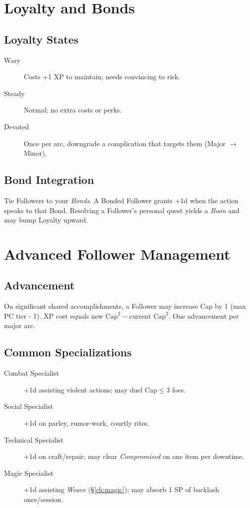 \begin{multicols}{2}
\section{Loyalty and Bonds}

\subsection*{Loyalty States}
\begin{description}
  \item[Wary] Costs +1 XP to maintain; needs convincing to risk.
  \item[Steady] Normal; no extra costs or perks.
  \item[Devoted] Once per arc, downgrade a complication that targets them (Major \(\rightarrow\) Minor). 
\end{description}

\subsection*{Bond Integration}
Tie Followers to your \emph{Bonds}. A Bonded Follower grants +1d when the action speaks to that Bond. Resolving a Follower’s personal quest yields a \emph{Boon} and may bump Loyalty upward.

\section{Advanced Follower Management}

\subsection*{Advancement}
On significant shared accomplishments, a Follower may increase Cap by 1 (max PC tier - 1). XP cost equals \(\text{new Cap}^2 - \text{current Cap}^2\). One advancement per major arc.

\subsection*{Common Specializations}
\begin{description}
  \item[Combat Specialist] +1d assisting violent actions; may duel Cap\(\leq\)3 foes.
  \item[Social Specialist] +1d on parley, rumor-work, courtly rites.
  \item[Technical Specialist] +1d on craft/repair; may clear \emph{Compromised} on one item per downtime.
  \item[Magic Specialist] +1d assisting \emph{Weave} (\S\ref{ch:magic}); may absorb 1 SP of backlash once/session. 
\end{description}


\end{multicols}
